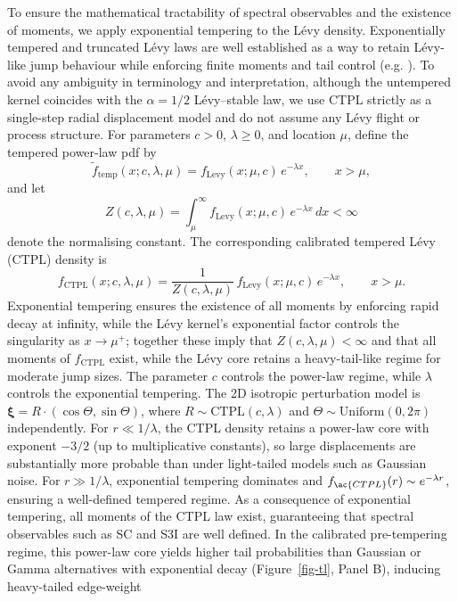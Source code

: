 \documentclass[
  11pt,
  letterpaper]{siamart251216}
\begin{document}
To ensure the mathematical tractability of spectral observables and the
existence of moments, we apply exponential tempering to the Lévy
density. Exponentially tempered and truncated Lévy laws are well
established as a way to retain Lévy-like jump behaviour while enforcing
finite moments and tail control (e.g.
\citep{Koponen1995, Rosinski2007, ContTankov2004}). To avoid any
ambiguity in terminology and interpretation, although the untempered
kernel coincides with the \(\alpha=1/2\) Lévy--stable law, we use CTPL
strictly as a single-step radial displacement model and do not assume
any Lévy flight or process structure. For parameters \(c>0\),
\(\lambda\ge 0\), and location \(\mu\), define the tempered power-law
pdf by \[
\tilde{f}_{\text{temp}}(x; c, \lambda, \mu)
= f_{\text{Levy}}(x; \mu, c)\, e^{-\lambda x}, \qquad x>\mu,
\] and let \[
Z(c,\lambda,\mu)
= \int_{\mu}^{\infty} f_{\text{Levy}}(x; \mu, c)\, e^{-\lambda x}\,dx
< \infty
\] denote the normalising constant. The corresponding calibrated
tempered Lévy (CTPL) density is \[
f_{\text{CTPL}}(x; c, \lambda, \mu)
= \frac{1}{Z(c,\lambda,\mu)}\, f_{\text{Levy}}(x; \mu, c)\, e^{-\lambda x},
\qquad x>\mu.
\] Exponential tempering ensures the existence of all moments by
enforcing rapid decay at infinity, while the Lévy kernel's exponential
factor controls the singularity as \(x \to \mu^+\); together these imply
that \(Z(c,\lambda,\mu) < \infty\) and that all moments of
\(f_{\text{CTPL}}\) exist, while the Lévy core retains a heavy-tail-like
regime for moderate jump sizes. The parameter \(c\) controls the
power-law regime, while \(\lambda\) controls the exponential tempering.
The 2D isotropic perturbation model is
\(\boldsymbol{\xi} = R \cdot (\cos \Theta, \sin \Theta)\), where
\(R \sim \text{CTPL}(c, \lambda)\) and
\(\Theta \sim \text{Uniform}(0, 2\pi)\) independently. For
\(r \ll 1/\lambda\), the \ac{CTPL} density retains a power-law core with
exponent \(-3/2\) (up to multiplicative constants), so large
displacements are substantially more probable than under light-tailed
models such as Gaussian noise. For \(r \gg 1/\lambda\), exponential
tempering dominates and \(f_{\ac{CTPL}}(r) \sim e^{-\lambda r}\),
ensuring a well-defined tempered regime. As a consequence of exponential
tempering, all moments of the \ac{CTPL} law exist, guaranteeing that
spectral observables such as \ac{SC} and \ac{S3I} are well defined. In
the calibrated pre-tempering regime, this power-law core yields higher
tail probabilities than Gaussian or Gamma alternatives with exponential
decay (Figure~\ref{fig-tl}, Panel B), inducing heavy-tailed edge-weight
\end{document}
